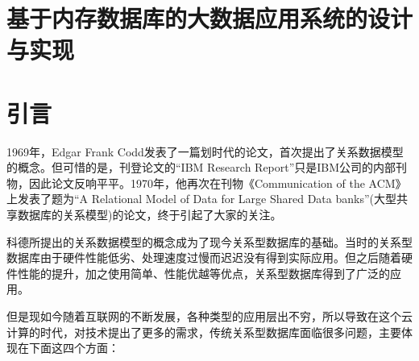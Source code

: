 \documentclass[literaturereview]{zjutreport}
\begin{document}



\frontmatter

\begingroup %
\let\clearpage\relax %

\titleformat{\chapter}[block]{\sihao\heiti\filcenter\bfseries}{\CJKnumber{\thechapter}}{1ex}{}{} %
\chapter*{基于内存数据库的大数据应用系统的设计与实现}
{} %


\mainmatter
\chapter{引言}
1969年，Edgar Frank Codd发表了一篇划时代的论文，首次提出了关系数据模型的概念。但可惜的是，刊登论文的“IBM Research Report”只是IBM公司的内部刊物，因此论文反响平平。1970年，他再次在刊物《Communication of the ACM》上发表了题为“A Relational Model of Data for Large Shared Data banks”(大型共享数据库的关系模型)的论文，终于引起了大家的关注。

科德所提出的关系数据模型的概念成为了现今关系型数据库的基础。当时的关系型数据库由于硬件性能低劣、处理速度过慢而迟迟没有得到实际应用。但之后随着硬件性能的提升，加之使用简单、性能优越等优点，关系型数据库得到了广泛的应用。

但是现如今随着互联网的不断发展，各种类型的应用层出不穷，所以导致在这个云计算的时代，对技术提出了更多的需求，传统关系型数据库面临很多问题，主要体现在下面这四个方面：
\end{document}
